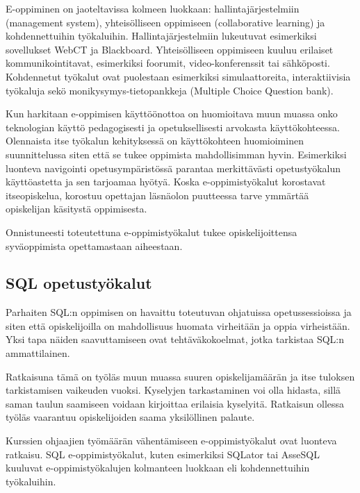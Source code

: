 \documentclass[finnish,twoside,openright]{HYgraduMLDS}
\begin{document}
E-oppiminen on jaoteltavissa kolmeen luokkaan\cite{sadiq2004sqlator}: hallintajärjestelmiin (management system), yhteisölliseen oppimiseen (collaborative learning) ja kohdennettuihin työkaluihin. Hallintajärjestelmiin lukeutuvat esimerkiksi sovellukset WebCT ja Blackboard. Yhteisölliseen oppimiseen kuuluu erilaiset kommunikointitavat, esimerkiksi foorumit, video-konferenssit tai sähköposti. Kohdennetut työkalut ovat puolestaan esimerkiksi simulaattoreita, interaktiivisia työkaluja sekö monikysymys-tietopankkeja (Multiple Choice Question bank).

Kun harkitaan e-oppimisen käyttöönottoa on huomioitava muun muassa onko teknologian käyttö pedagogisesti ja opetuksellisesti arvokasta käyttökohteessa\cite{sadiq2004sqlator}. Olennaista itse työkalun kehityksessä on käyttökohteen huomioiminen suunnittelussa siten että se tukee oppimista mahdollisimman hyvin. Esimerkiksi luonteva navigointi opetusympäristössä parantaa merkittävästi opetustyökalun käyttöastetta ja sen tarjoamaa hyötyä\cite{Brusilovsky:2010:LSP:1656255.1656257}. Koska e-oppimistyökalut korostavat itseopiskelua, korostuu opettajan läsnäolon puutteessa tarve ymmärtää opiskelijan käsitystä oppimisesta\cite{sadiq2004sqlator}.

Onnistuneesti toteutettuna e-oppimistyökalut tukee opiskelijoittensa syväoppimista opettamastaan aiheestaan\cite{sadiq2004sqlator}.


\subsection{SQL opetustyökalut}

Parhaiten SQL:n oppimisen on havaittu toteutuvan ohjatuissa opetussessioissa ja siten että opiskelijoilla on mahdollisuus huomata virheitään ja oppia virheistään\cite{sadiq2004sqlator}. Yksi tapa näiden saavuttamiseen ovat tehtäväkokoelmat, jotka tarkistaa SQL:n ammattilainen. 

Ratkaisuna tämä on työläs muun muassa suuren opiskelijamäärän ja itse tuloksen tarkistamisen vaikeuden vuoksi. Kyselyjen tarkastaminen voi olla hidasta, sillä saman taulun saamiseen voidaan kirjoittaa erilaisia kyselyitä. Ratkaisun ollessa työläs vaarantuu opiskelijoiden saama yksilöllinen palaute\cite{sadiq2004sqlator}.

Kurssien ohjaajien työmäärän vähentämiseen e-oppimistyökalut ovat luonteva ratkaisu. SQL e-oppimistyökalut, kuten esimerkiksi SQLator tai AsseSQL kuuluvat e-oppimistyökalujen kolmanteen luokkaan eli kohdennettuihin työkaluihin\cite{sadiq2004sqlator}.
\end{document}
